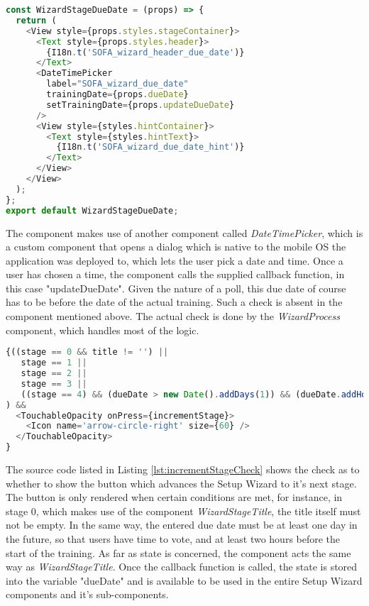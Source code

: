 \begin{lstlisting}[language=javascript,caption=Simplified Poll Due Date Component,label=lst:pollDueDateComponent]
const WizardStageDueDate = (props) => {
  return (
    <View style={props.styles.stageContainer}>
      <Text style={props.styles.header}>
        {I18n.t('SOFA_wizard_header_due_date')}
      </Text>
      <DateTimePicker
        label="SOFA_wizard_due_date"
        trainingDate={props.dueDate}
        setTrainingDate={props.updateDueDate}
      />
      <View style={styles.hintContainer}>
        <Text style={styles.hintText}>
          {I18n.t('SOFA_wizard_due_date_hint')}
        </Text>
      </View>
    </View>
  );
};
export default WizardStageDueDate;
\end{lstlisting}

The component makes use of another component called \textit{DateTimePicker}, which is a custom component that opens a dialog which is native to the mobile OS the application was deployed to, which lets the user pick a date and time. Once a user has chosen a time, the component calls the supplied callback function, in this case "updateDueDate".
\newline
Given the nature of a poll, this due date of course has to be before the date of the actual training. Such a check is absent in the component mentioned above. The actual check is done by the \textit{WizardProcess} component, which handles most of the logic.

\begin{lstlisting}[language=javascript,caption=Increment Stage Check,label=lst:incrementStageCheck]
{((stage == 0 && title != '') ||
   stage == 1 ||
   stage == 2 ||
   stage == 3 ||
   ((stage == 4) && (dueDate > new Date().addDays(1)) && (dueDate.addHours(2) < trainingDate))
) &&
  <TouchableOpacity onPress={incrementStage}>
    <Icon name='arrow-circle-right' size={60} />
  </TouchableOpacity>
}
\end{lstlisting}

The source code listed in Listing \ref{lst:incrementStageCheck} shows the check as to whether to show the button which advances the Setup Wizard to it's next stage. The button is only rendered when certain conditions are met, for instance, in stage 0, which makes use of the component \textit{WizardStageTitle}, the title itself must not be empty. In the same way, the entered due date must be at least one day in the future, so that users have time to vote, and at least two hours before the start of the training.
\newline
As far as state is concerned, the component acts the same way as \textit{WizardStageTitle}. Once the callback function is called, the state is stored into the variable "dueDate" and is available to be used in the entire Setup Wizard components and it's sub-components.

